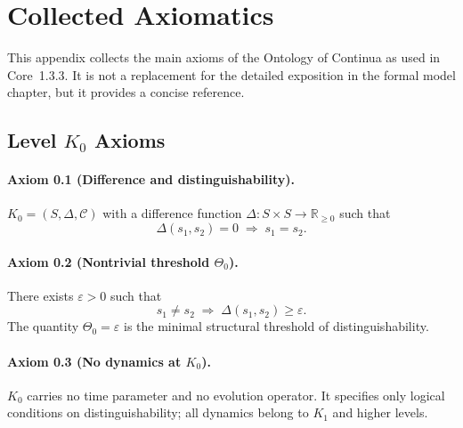 
\section{Collected Axiomatics}
\label{app:axioms-full}

This appendix collects the main axioms of the Ontology of Continua as used in
Core~1.3.3.  It is not a replacement for the detailed exposition in
the formal model chapter, but it provides a concise reference.

\subsection{Level \texorpdfstring{$K_0$}{K0} Axioms}

\paragraph{Axiom 0.1 (Difference and distinguishability).}
\(K_0 = (S,\Delta,\mathcal{C})\) with a difference function
\(\Delta : S\times S \to \mathbb{R}_{\ge 0}\) such that
\[
  \Delta(s_1,s_2) = 0 \;\Rightarrow\; s_1 = s_2.
\]

\paragraph{Axiom 0.2 (Nontrivial threshold \texorpdfstring{\(\Theta_0\)}{\Theta_0}).}
There exists \(\varepsilon>0\) such that
\[
  s_1\neq s_2 \;\Rightarrow\; \Delta(s_1,s_2)\ge\varepsilon.
\]
The quantity \(\Theta_0=\varepsilon\) is the minimal structural threshold of
distinguishability.

\paragraph{Axiom 0.3 (No dynamics at \texorpdfstring{\(K_0\)}{K_0}).}
\(K_0\) carries no time parameter and no evolution operator.  It specifies only
logical conditions on distinguishability; all dynamics belong to \(K_1\) and
higher levels.

